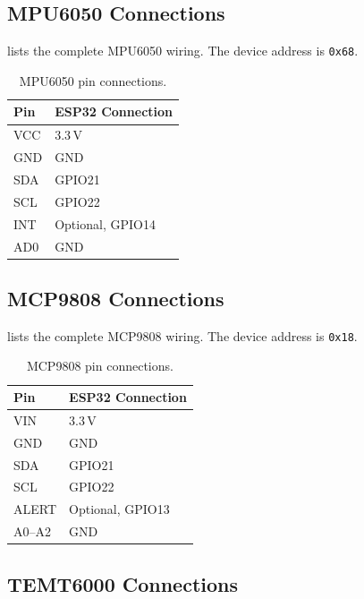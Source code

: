 \subsection{MPU6050 Connections}
\label{sec:mpu6050-connections}

 lists the complete MPU6050 wiring. The device address is \texttt{0x68}.

\begin{table}[H]
\centering
\caption{MPU6050 pin connections.}
\label{tab:mpu6050-wiring}
\small
\begin{tabularx}{\columnwidth}{@{}l Y@{}}
\toprule
\textbf{Pin} & \textbf{ESP32 Connection} \\
\midrule
VCC & 3.3\,V \\
GND & GND \\
SDA & GPIO21 \\
SCL & GPIO22 \\
INT & Optional, GPIO14 \\
AD0 & GND \\
\bottomrule
\end{tabularx}
\end{table}

\subsection{MCP9808 Connections}
\label{sec:mcp9808-connections}

 lists the complete MCP9808 wiring. The device address is \texttt{0x18}.

\begin{table}[H]
\centering
\caption{MCP9808 pin connections.}
\label{tab:mcp9808-wiring}
\small
\begin{tabularx}{\columnwidth}{@{}l Y@{}}
\toprule
\textbf{Pin} & \textbf{ESP32 Connection} \\
\midrule
VIN & 3.3\,V \\
GND & GND \\
SDA & GPIO21 \\
SCL & GPIO22 \\
ALERT & Optional, GPIO13 \\
A0--A2 & GND \\
\bottomrule
\end{tabularx}
\end{table}

\subsection{TEMT6000 Connections}
\label{sec:temt6000-connections}


